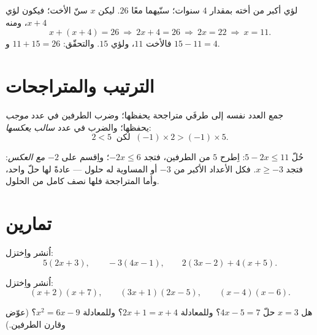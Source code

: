 \begin{example}\label{ex:g8:equations:problem}
لؤي أكبر من أخته بمقدار $4$ سنوات؛  سنّيهما معًا
$26$. ليكن $x$ سنّ الأخت؛ فيكون لؤي $x + 4$، ومنه
\[
x + (x + 4) = 26
\ \Longrightarrow\
2x + 4 = 26
\ \Longrightarrow\
2x = 22
\ \Longrightarrow\
x = 11 .
\]
فالأخت $11$، ولؤي $15$. والتحقّق: $11 + 15 = 26$ و
$15 - 11 = 4$.
\end{example}

\section{الترتيب والمتراجحات}

\begin{proposition}\label{prop:g8:equations:order}
جمع العدد نفسه إلى طرفَي متراجحة يحفظها؛
وضرب الطرفين في عدد \emph{موجب} يحفظها؛
والضرب في عدد \emph{سالب} \emph{يعكسها}:
\[
2 < 5 \ \text{ لكن }\ (-1) \times 2 > (-1) \times 5 .
\]
\end{proposition}
\admitted

\begin{example}\label{ex:g8:equations:inequality}
حُلّ $5 - 2x \leq 11$: اِطرح $5$ من الطرفين، فتجد $-2x \leq 6$؛
واِقسم على $-2$ \emph{مع العكس}: فتجد $x \geq -3$. فكل الأعداد
الأكبر من $-3$ أو المساوية له حلول ---  عادةً
لها حلّ واحد، وأما المتراجحة فلها نصف  كامل من الحلول.
\end{example}

\section{تمارين}

\begin{exercise}[$\star$]\label{exo:g8:equations:1}
اُنشر واِختزل:
\[
5(2x + 3), \qquad
-3(4x - 1), \qquad
2(3x - 2) + 4(x + 5).
\]
\end{exercise}

\begin{exercise}[$\star$]\label{exo:g8:equations:2}
اُنشر واِختزل:
\[
(x + 2)(x + 7), \qquad
(3x + 1)(2x - 5), \qquad
(x - 4)(x - 6).
\]
\end{exercise}

\begin{exercise}[$\star$]\label{exo:g8:equations:3}
هل $x = 3$ حلّ  $4x - 5 = 7$؟ وللمعادلة $2x + 1 = x + 4$؟ وللمعادلة
$x^2 = 6x - 9$؟ (عوّض وقارن الطرفين.)
\end{exercise}

